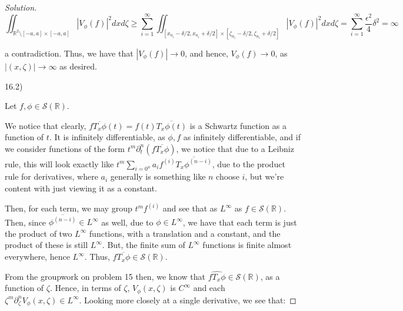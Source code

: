 \documentclass[10pt]{article}
\begin{document}
\begin{proof}[Solution]
$$ \iint_{\mathbb{R}^2 \setminus [-a,a] \times [-a,a]} |V_\phi(f)|^2 dx d\zeta \geq \sum_{i=1}^\infty \iint_{[x_{n_i} - \delta/2, x_{n_i} + \delta/2] \times [\zeta_{n_i} - \delta/2, \zeta_{n_i} + \delta/2]} | V_\phi(f)|^2 dx d\zeta = \sum_{i=1}^\infty \frac{\epsilon^2}{4} \delta^2 = \infty$$

a contradiction. Thus, we have that $|V_\phi(f)| \to 0$, and hence, $V_\phi(f) \to 0$, as $|(x, \zeta)| \to \infty$ as desired.




16.2)

Let $f, \phi \in \mathcal{S}(\mathbb{R})$. %



We notice that clearly, $f \overline{T_x \phi} (t) = f(t)\overline{ T_x \phi (t)}$ is a Schwartz function as a function of $t$. It is infinitely differentiable, as $\phi, f$ as infinitely differentiable, and if we consider functions of the form $t^m \partial^n_t (f \overline{T_x \phi} )$, we notice that due to a Leibniz rule, this will look exactly like $t^m \sum_{i=0^n} a_i f^{(i)}\overline{ T_x \phi^{(n-i)}}$, due to the product rule for derivatives, where $a_i$ generally is something like $n$ choose $i$, but we're content with just viewing it as a constant.

Then, for each term, we may group $t^m f^{(i)}$ and see that as $L^\infty$ as $f \in \mathcal{S}(\mathbb{R})$. Then, since $\overline{\phi^{(n-i)}} \in L^\infty$ as well, due to $\phi \in L^\infty$, we have that each term is just the product of two $L^\infty$ functions, with a translation and a constant, and the product of these is still $L^\infty$. But, the finite sum of $L^\infty$ functions is finite almost everywhere, hence $L^\infty$. Thus, $f \overline{T_x \phi} \in \mathcal{S}(\mathbb{R})$.

From the groupwork on problem 15 then, we know that $\widehat{f T_x \phi} \in \mathcal{S}(\mathbb{R})$, as a function of $\zeta$. Hence, in terms of $\zeta$, $V_\phi(x, \zeta)$ is $C^\infty$ and each $\zeta^m \partial^n_\zeta V_\phi(x, \zeta) \in L^\infty$. Looking more closely at a single derivative, we see that:


\end{proof}
\end{document}
